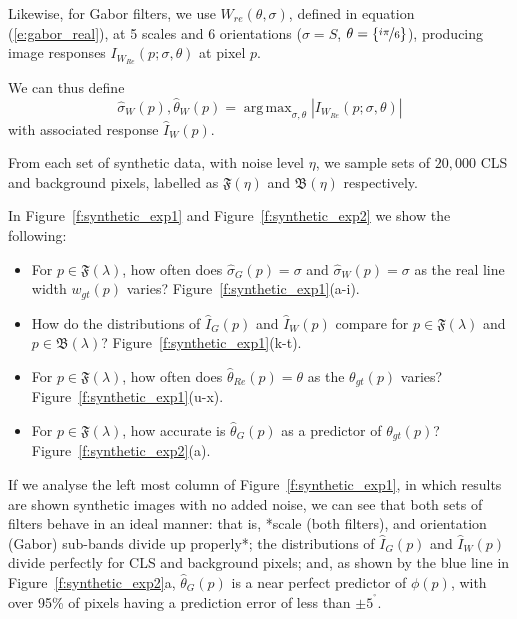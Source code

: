 \documentclass{IEEEtran}
\newcommand{\fref}[1]{Figure~\ref{#1}}
\newcommand{\eref}[1]{(\ref{#1})}
\DeclareMathOperator*{\argmax}{arg\,max}
\def\deg{\ensuremath{^\circ}}
\begin{document}
Likewise, for Gabor filters, we use $W_{re}(\theta,\sigma)$, defined in equation \eref{e:gabor_real}, at 5 scales and 6 orientations ($ \sigma = S$, $\theta = \{ \nicefrac{i\pi}{6}\}$), producing image responses $I_{W_{Re}}(p ; \sigma, \theta)$ at pixel $p$.

We can thus define
%
\begin{equation}
\hat{\sigma}_{W}(p), \hat{\theta}_{W}(p) = \argmax_{\sigma, \theta} |I_{W_{Re}}(p ; \sigma, \theta)|
\end{equation}
%
with associated response $\hat{I}_{W}(p)$.

From each set of synthetic data, with noise level $\eta$, we sample sets of $20,000$ CLS and background pixels, labelled as $\mathfrak{F}(\eta)$ and $\mathfrak{B}(\eta)$ respectively.

In \fref{f:synthetic_exp1} and \fref{f:synthetic_exp2} we show the following:

\begin{itemize}

    \item For $p \in \mathfrak{F}(\lambda)$, how often does $\hat{\sigma}_{G}(p) = \sigma$ and $\hat{\sigma}_{W}(p) = \sigma$ as the real line width $w_{gt}(p)$ varies? \fref{f:synthetic_exp1}(a-i).
    \item How do the distributions of $\hat{I}_{G}(p)$ and $\hat{I}_{W}(p)$ compare for $p \in \mathfrak{F}(\lambda)$ and $p \in \mathfrak{B}(\lambda)$? \fref{f:synthetic_exp1}(k-t).
    \item For $p \in \mathfrak{F}(\lambda)$, how often does $\hat{\theta}_{Re}(p) = \theta$ as the $\theta_{gt}(p)$ varies? \fref{f:synthetic_exp1}(u-x).
    \item For $p \in \mathfrak{F}(\lambda)$, how accurate is $\hat{\theta}_G(p)$ as a predictor of $\theta_{gt}(p)$? \fref{f:synthetic_exp2}(a).
\end{itemize}

If we analyse the left most column of \fref{f:synthetic_exp1}, in which results are shown synthetic images with no added noise, we can see that both sets of filters behave in an ideal manner: that is, *scale (both filters), and orientation (Gabor) sub-bands divide up properly*; the distributions of $\hat{I}_{G}(p)$ and $\hat{I}_{W}(p)$ divide perfectly for CLS and background pixels; and, as shown by the blue line in \fref{f:synthetic_exp2}a, $\hat{\theta}_G(p)$ is a near perfect predictor of $\phi(p)$, with over 95\% of pixels having a prediction error of less than $\pm5^{\deg}$.
\end{document}

